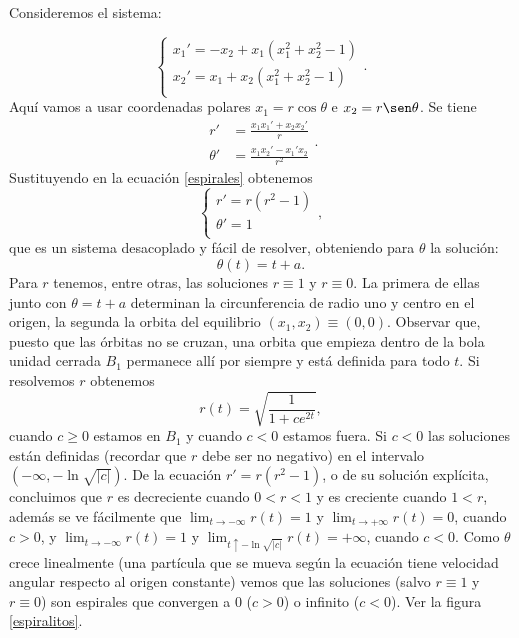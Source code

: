\begin{ejemplo}\label{espira} Consideremos el sistema:

\begin{equation}\label{espirales}
\left\{%
\begin{array}{l}
    x_1'=-x_2+x_1(x_1^2+x_2^2-1) \\
    x_2'=x_1+ x_2(x_1^2+x_2^2-1)\\
\end{array} .%
\right.
\end{equation}
 Aquí vamos a
usar coordenadas polares $x_1=r\cos \theta$ e $x_2=r\sen \theta$.
Se tiene
\[
    \begin{split}
    r'&=\frac{x_1x_1'+x_2x_2'}{r}\\
    \theta'&=\frac{x_1x_2'-x_1'x_2}{r^2}
    \end{split}.
\]
Sustituyendo en la ecuación \eqref{espirales} obtenemos
\begin{equation}\label{espirales2}
\left\{%
\begin{array}{l}
    r'=r(r^2-1) \\
    \theta'=1\\
\end{array} ,%
\right.
\end{equation}
que es un sistema desacoplado y fácil de resolver, obteniendo para
$\theta$ la solución:
\[
    \theta(t)=t+a.
\]
Para $r$ tenemos, entre otras,  las soluciones $r\equiv 1$ y
$r\equiv 0$. La primera de ellas junto con $\theta=t+a$ determinan
la circunferencia de radio uno y centro en el origen, la segunda
la orbita del equilibrio $(x_1,x_2)\equiv(0,0)$. Observar que,
puesto que las órbitas no se cruzan, una orbita que empieza dentro
de la bola unidad cerrada $B_1$ permanece allí por siempre y está
definida para todo $t$. Si  resolvemos $r$ obtenemos
\[
r(t)=\sqrt{\frac{1}{1+ce^{2t}}},
\]
cuando $c\geq 0$ estamos en $B_1$ y cuando $c<0$ estamos fuera. Si
$c<0$ las soluciones están definidas (recordar que $r$ debe ser no
negativo) en el intervalo $(-\infty,-\ln\sqrt{|c|})$. De la
ecuación $r'=r(r^2-1)$, o de su solución explícita, concluimos que
$r$ es decreciente cuando $0<r<1$ y es creciente cuando $1<r$,
además se ve fácilmente que $\lim_{t\to -\infty}r(t)=1$ y
$\lim_{t\to +\infty}r(t)=0$, cuando $c>0$, y $\lim_{t\to
-\infty}r(t)=1$ y $\lim_{t\uparrow -\ln \sqrt{|c|}}r(t)=+\infty$,
cuando $c<0$. Como $\theta$ crece linealmente (una partícula que
se mueva según la ecuación tiene velocidad angular respecto al
origen constante) vemos que las soluciones (salvo $r\equiv 1$ y
$r\equiv 0$) son espirales que convergen a $0$ ($c>0$) o infinito
($c<0$). Ver la figura \ref{espiralitos}.
\begin{figure}[h]
\begin{center}
\def\Func{-y[1]+y[0]*(y[1]^2+y[0]^2-1)|y[0]+y[1]*(y[1]^2+y[0]^2-1)}


\end{center}
\end{figure}
\end{ejemplo}
